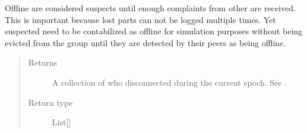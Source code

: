 \documentclass[letterpaper,10pt,english]{sphinxmanual}
\begin{document}
\begin{fulllineitems}
\begin{fulllineitems}
\begin{description}
Offline {\hyperref[\detokenize{app.domain:app.domain.network_nodes.SGNodeExt}]{}}
are considered suspects until enough complaints
from other  {\hyperref[\detokenize{app.domain:app.domain.cluster_groups.Cluster.members}]{}} are received.
This is important because lost parts can not be logged multiple
times. Yet suspected {\hyperref[\detokenize{app.domain:app.domain.network_nodes.SGNodeExt}]{}} need to be contabilized
as offline for simulation purposes without being evicted from the
group until they are detected by their peers as being offline.

\end{description}
\begin{quote}\begin{description}
\item[{Returns}] \leavevmode
A collection of {\hyperref[\detokenize{app.domain:app.domain.cluster_groups.Cluster.members}]{}} who disconnected
during the current epoch.
See {\hyperref[\detokenize{app.domain:app.domain.network_nodes.SGNodeExt.update_status}]{}}.

\item[{Return type}] \leavevmode
List{[}{\hyperref[\detokenize{app:app.type_hints.NodeType}]{}}{]}

\end{description}\end{quote}

\end{fulllineitems}


\end{fulllineitems}

\end{document}
